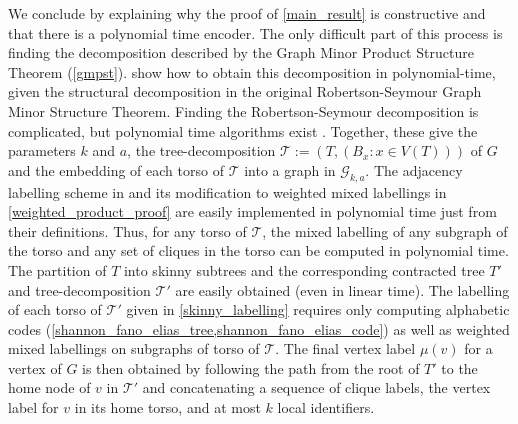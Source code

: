\documentclass{patmorin}
\newcommand{\vida}[1]{\noindent{\color{pink} VD: #1}}
\newcommand{\calG}{\mathcal{G}}
\newcommand{\calT}{\mathcal{T}}
\begin{document}
We conclude by explaining why the proof of \cref{main_result} is constructive and that there is a polynomial time encoder.  The only difficult part of this process is finding the decomposition described by the Graph Minor Product Structure Theorem (\cref{gmpst}).  \citet{dujmovic.joret.ea:planar} show how to obtain this decomposition in polynomial-time, given the structural decomposition in the original Robertson-Seymour Graph Minor Structure Theorem. Finding the Robertson-Seymour decomposition is complicated, but polynomial time algorithms exist \cite{kawarabayashi2018flat,kawarabayashi2020new,gorsky2025polynomial,demaine2005algorithmic}.  Together, these give the parameters $k$ and $a$, the tree-decomposition $\calT:=(T, (B_x:x\in V(T)))$ of $G$ and the embedding of each torso of $\calT$ into a graph in $\calG_{k,a}$. The adjacency labelling scheme in \cite{dujmovic.esperet.ea:adjacency} and its modification to weighted mixed labellings in \cref{weighted_product_proof} are easily implemented in polynomial time just from their definitions.  Thus, for any torso of $\calT$, the mixed labelling of any subgraph of the torso and any set of cliques in the torso can be computed in polynomial time.  The partition of $T$ into skinny subtrees and the corresponding contracted tree $T'$ and tree-decomposition $\calT'$ are easily obtained (even in linear time).  The labelling of each torso of $\calT'$ given in \cref{skinny_labelling} requires only computing  alphabetic codes (\cref{shannon_fano_elias_tree,shannon_fano_elias_code}) as well as weighted mixed labellings on subgraphs of torso of $\calT$.  The final vertex label $\mu(v)$ for a vertex of $G$ is then obtained by following the path from the root of $T'$ to the home node of $v$ in $\calT'$ and concatenating a sequence of clique labels, the vertex label for $v$ in its home torso, and at most $k$ local identifiers.



\end{document}
